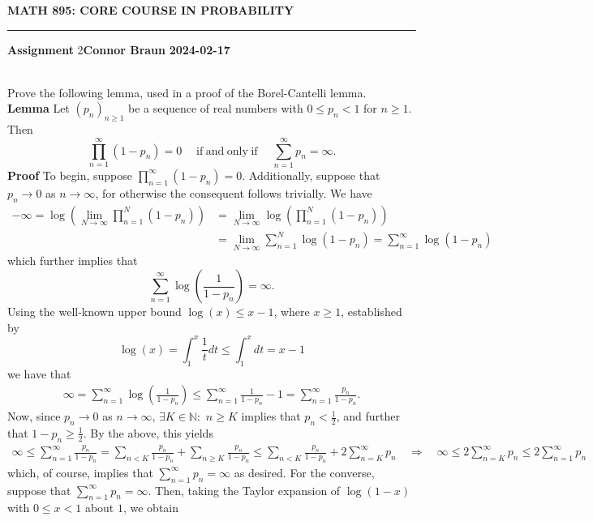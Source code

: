 \documentclass[10pt]{article}
\newcommand{\bp}[1]{\left({#1}\right)}
\newcommand{\mbb}[1]{\mathbb{#1}}
\newcommand{\1}[1]{\mathbbm{1}_{#1}}
\DeclareMathOperator{\ifff}{if\;and\;only\;if}
\begin{document}
    \begin{center}
        {\bf\large{MATH 895: CORE COURSE IN PROBABILITY}}
        \smallskip
        \hrule
        \smallskip
        {\bf Assignment} 2\hfill {\bf Connor Braun} \hfill {\bf 2024-02-17}
    \end{center}
    \\[5pt]
    Prove the following lemma, used in a proof of the Borel-Cantelli lemma.\\[5pt]
    {\bf Lemma}\hspace{5pt} Let $(p_n)_{n\geq 1}$ be a sequence of real numbers with $0\leq p_n<1$ for $n\geq 1$. Then
    \[\prod_{n=1}^\infty(1-p_n)=0\quad\ifff\quad\sum_{n=1}^\infty p_n=\infty.\]
    {\bf Proof}\hspace{5pt} To begin, suppose $\prod_{n=1}^\infty(1-p_n)=0$. Additionally, suppose that $p_n\rightarrow 0$ as $n\rightarrow \infty$, for otherwise the consequent follows trivially. We have
    \begin{align*}
        -\infty=\log\bp{\lim_{N\rightarrow\infty}\prod_{n=1}^N(1-p_n)}&=\lim_{N\rightarrow\infty}\log\bp{\prod_{n=1}^N(1-p_n)}\tag{continuity of logarithms}\\
        &=\lim_{N\rightarrow\infty}\sum_{n=1}^N\log(1-p_n)=\sum_{n=1}^\infty\log(1-p_n)
    \end{align*}
    which further implies that 
    \[\sum_{n=1}^\infty\log\bp{\frac{1}{1-p_n}}=\infty.\]
    Using the well-known upper bound $\log(x)\leq x-1$, where $x\geq 1$, established by
    \[\log(x)=\int_1^x\frac{1}{t}dt\leq \int_1^xdt=x-1\]
    we have that
    \begin{align*}
        \infty=\sum_{n=1}^\infty\log\bp{\frac{1}{1-p_n}}\leq\sum_{n=1}^\infty\frac{1}{1-p_n}-1=\sum_{n=1}^\infty\frac{p_n}{1-p_n}.
    \end{align*}
    Now, since $p_n\rightarrow 0$ as $n\rightarrow\infty$, $\exists K\in\mbb{N}:$ $n\geq K$ implies that $p_n<\tfrac{1}{2}$, and further that $1-p_n\geq \tfrac{1}{2}$. By the above, this yields
    \begin{align*}
        \infty\leq\sum_{n=1}^\infty\frac{p_n}{1-p_n}=\sum_{n<K}\frac{p_n}{1-p_n}+\sum_{n\geq K}\frac{p_n}{1-p_n}\leq \sum_{n<K}\frac{p_n}{1-p_n}+2\sum_{n=K}^\infty p_n\quad\Rightarrow\quad \infty \leq 2\sum_{n=K}^\infty p_n \leq 2\sum_{n=1}^\infty p_n
    \end{align*}
    which, of course, implies that $\sum_{n=1}^\infty p_n=\infty$ as desired. For the converse, suppose that $\sum_{n=1}^\infty p_n=\infty$. Then, taking the Taylor expansion of $\log(1-x)$ with $0\leq x<1$ about $1$, we obtain
\end{document}
